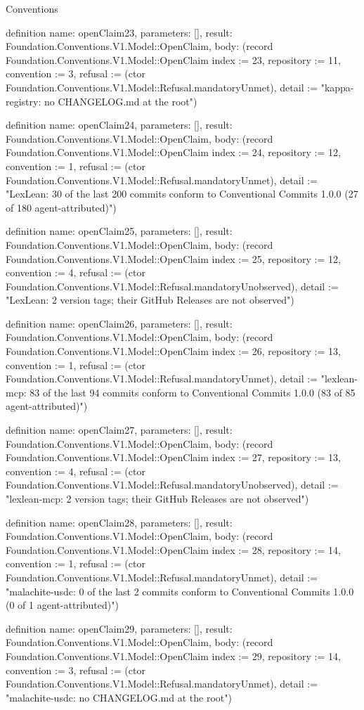 \begin{lexlean}{Conventions}
\begin{semanticmodule}
definition{
  name: openClaim23,
  parameters: [],
  result: Foundation.Conventions.V1.Model::OpenClaim,
  body: (record Foundation.Conventions.V1.Model::OpenClaim {index := 23, repository := 11, convention := 3, refusal := (ctor Foundation.Conventions.V1.Model::Refusal.mandatoryUnmet), detail := "kappa-registry: no CHANGELOG.md at the root"})
}

definition{
  name: openClaim24,
  parameters: [],
  result: Foundation.Conventions.V1.Model::OpenClaim,
  body: (record Foundation.Conventions.V1.Model::OpenClaim {index := 24, repository := 12, convention := 1, refusal := (ctor Foundation.Conventions.V1.Model::Refusal.mandatoryUnmet), detail := "LexLean: 30 of the last 200 commits conform to Conventional Commits 1.0.0 (27 of 180 agent-attributed)"})
}

definition{
  name: openClaim25,
  parameters: [],
  result: Foundation.Conventions.V1.Model::OpenClaim,
  body: (record Foundation.Conventions.V1.Model::OpenClaim {index := 25, repository := 12, convention := 4, refusal := (ctor Foundation.Conventions.V1.Model::Refusal.mandatoryUnobserved), detail := "LexLean: 2 version tags; their GitHub Releases are not observed"})
}

definition{
  name: openClaim26,
  parameters: [],
  result: Foundation.Conventions.V1.Model::OpenClaim,
  body: (record Foundation.Conventions.V1.Model::OpenClaim {index := 26, repository := 13, convention := 1, refusal := (ctor Foundation.Conventions.V1.Model::Refusal.mandatoryUnmet), detail := "lexlean-mcp: 83 of the last 94 commits conform to Conventional Commits 1.0.0 (83 of 85 agent-attributed)"})
}

definition{
  name: openClaim27,
  parameters: [],
  result: Foundation.Conventions.V1.Model::OpenClaim,
  body: (record Foundation.Conventions.V1.Model::OpenClaim {index := 27, repository := 13, convention := 4, refusal := (ctor Foundation.Conventions.V1.Model::Refusal.mandatoryUnobserved), detail := "lexlean-mcp: 2 version tags; their GitHub Releases are not observed"})
}

definition{
  name: openClaim28,
  parameters: [],
  result: Foundation.Conventions.V1.Model::OpenClaim,
  body: (record Foundation.Conventions.V1.Model::OpenClaim {index := 28, repository := 14, convention := 1, refusal := (ctor Foundation.Conventions.V1.Model::Refusal.mandatoryUnmet), detail := "malachite-usdc: 0 of the last 2 commits conform to Conventional Commits 1.0.0 (0 of 1 agent-attributed)"})
}

definition{
  name: openClaim29,
  parameters: [],
  result: Foundation.Conventions.V1.Model::OpenClaim,
  body: (record Foundation.Conventions.V1.Model::OpenClaim {index := 29, repository := 14, convention := 3, refusal := (ctor Foundation.Conventions.V1.Model::Refusal.mandatoryUnmet), detail := "malachite-usdc: no CHANGELOG.md at the root"})
}


\end{semanticmodule}
\end{lexlean}
